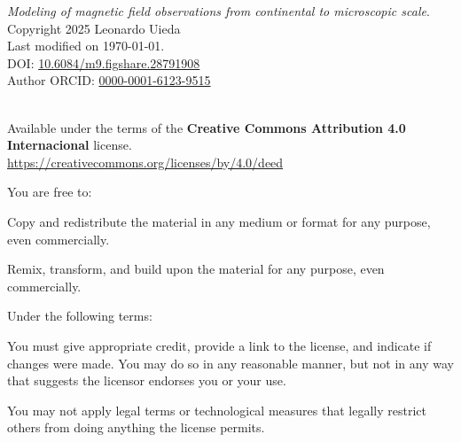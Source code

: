 \documentclass[10pt,a4paper,oneside]{book}
\newcommand{\ThesisYear}{2025}
\newcommand{\ThesisAuthor}{Leonardo Uieda}
\newcommand{\ThesisTitle}{Modeling of magnetic field observations from continental to microscopic scale}
\newcommand{\ThesisDOI}{10.6084/m9.figshare.28791908}
\newcommand{\ORCID}{0000-0001-6123-9515}
\begin{document}
{\small

\vspace*{\fill}

\noindent
\textit{\ThesisTitle{}}.
\\[0.2cm]
\textcopyright{} Copyright \ThesisYear{} \ThesisAuthor{}
\\[0.2cm]
Last modified on \today.
\\[0.2cm]
DOI: \href{https://doi.org/\ThesisDOI}{\ThesisDOI}
\\[0.2cm]
Author ORCID: \href{https://orcid.org/\ORCID}{\ORCID}

\vspace{2.5cm}

\noindent
\textbf{\LARGE \faCreativeCommons{} \faCreativeCommonsBy{}}
\\
Available under the terms of the
\textbf{Creative Commons Attribution 4.0 Internacional} license.
\\
\url{https://creativecommons.org/licenses/by/4.0/deed}

\vspace{0.25cm}

\noindent
You are free to:

\begin{description}[labelindent=0.5cm]
    \item[Share ---]{
        Copy and redistribute the material in any medium or format for any
        purpose, even commercially.
    }
    \item[Adapt ---]{
        Remix, transform, and build upon the material for any purpose, even
        commercially.
    }
\end{description}

\vspace{0.25cm}

\noindent
Under the following terms:

\begin{description}[labelindent=0.5cm]
    \item[Attribution ---]{
        You must give appropriate credit, provide a link to the license, and
        indicate if changes were made. You may do so in any reasonable manner,
        but not in any way that suggests the licensor endorses you or your use.
    }
    \item[No additional restrictions ---]{
        You may not apply legal terms or technological measures that legally
        restrict others from doing anything the license permits.
}
\end{description}

\vspace{2cm}

}
\newpage
\end{document}
